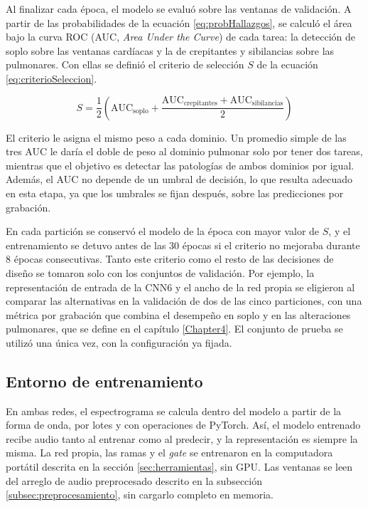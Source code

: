 Al finalizar cada época, el modelo se evaluó sobre las ventanas de validación. A partir de las
probabilidades de la ecuación \ref{eq:probHallazgos}, se calculó el área bajo la curva ROC (AUC,
\textit{Area Under the Curve}) de cada tarea: la detección de soplo sobre las ventanas cardíacas y
la de crepitantes y sibilancias sobre las pulmonares. Con ellas se definió el criterio de selección
$S$ de la ecuación \ref{eq:criterioSeleccion}.

\begin{equation}
	\label{eq:criterioSeleccion}
	S = \frac{1}{2}\left(\mathrm{AUC}_{\text{soplo}} +
	\frac{\mathrm{AUC}_{\text{crepitantes}} + \mathrm{AUC}_{\text{sibilancias}}}{2}\right)
\end{equation}

El criterio le asigna el mismo peso a cada dominio. Un promedio simple de las tres AUC le daría el
doble de peso al dominio pulmonar solo por tener dos tareas, mientras que el objetivo es detectar
las patologías de ambos dominios por igual. Además, el AUC no depende de un umbral de decisión, lo
que resulta adecuado en esta etapa, ya que los umbrales se fijan después, sobre las predicciones
por grabación.

En cada partición se conservó el modelo de la época con mayor valor de $S$, y el entrenamiento se
detuvo antes de las 30 épocas si el criterio no mejoraba durante 8 épocas consecutivas. Tanto este
criterio como el resto de las decisiones de diseño se tomaron solo con los conjuntos de
validación. Por ejemplo, la representación de entrada de la CNN6 y el ancho de la red propia se
eligieron al comparar las alternativas en la validación de dos de las cinco particiones, con una
métrica por grabación que combina el desempeño en soplo y en las alteraciones pulmonares, que se
define en el capítulo \ref{Chapter4}. El conjunto de prueba se utilizó una única vez, con la
configuración ya fijada.

\subsection{Entorno de entrenamiento}
\label{subsec:entornoEntrenamiento}

En ambas redes, el espectrograma se calcula dentro del modelo a partir de la forma de onda, por
lotes y con operaciones de PyTorch. Así, el modelo entrenado recibe audio tanto al entrenar como al
predecir, y la representación es siempre la misma. La red propia, las ramas y el \textit{gate} se
entrenaron en la computadora portátil descrita en la sección \ref{sec:herramientas}, sin GPU. Las
ventanas se leen del arreglo de audio preprocesado descrito en la subsección
\ref{subsec:preprocesamiento}, sin cargarlo completo en memoria.

